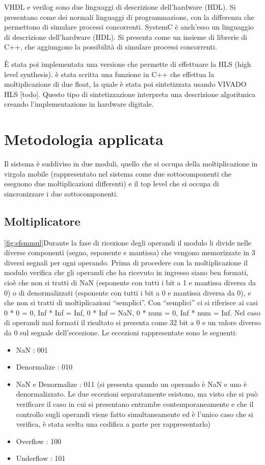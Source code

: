 \documentclass[]{IEEEtran}
\begin{document}
VHDL e verilog sono due linguaggi di descrizione dell’hardware (HDL). Si presentano come dei normali linguaggi di programmazione, con la differenza che permettono di simulare processi concorrenti. SystemC è anch’esso un linguaggio di descrizione dell’hardware (HDL). Si presenta come un insieme di librerie di C++, che aggiungono la possibilità di simulare processi concorrenti.

È stata poi implementata una versione che permette di effettuare la HLS (high level synthesis). è stata scritta una funzione in C++ che effettua la moltiplicazione di due float, la quale è stata poi sintetizzata usando VIVADO HLS [todo]. Questo tipo di sintetizzazione interpreta una descrizione algoritmica creando l’implementazione in hardware digitale. 

\section{Metodologia applicata}

Il sistema è suddiviso in due moduli, quello che si occupa della moltiplicazione in virgola mobile (rappresentato nel sistema come due sottocomponenti che eseguono due moltiplicazioni differenti) e il top level che si occupa di sincronizzare i due sottocomponenti.

\subsection{Moltiplicatore}
\ref{fig:efsmmul}Durante la fase di ricezione degli operandi il modulo li divide nelle diverse componenti (segno, esponente e mantissa) che vengono memorizzate in 3 diversi segnali per ogni operando. Prima di procedere con la moltiplicazione il modulo verifica che gli operandi che ha ricevuto in ingresso siano ben formati, cioè che non si tratti di NaN (esponente con tutti i bit a 1 e mantissa diversa da 0) o di denormalizzati (esponente con tutti i bit a 0 e mantissa diversa da 0), e che non si tratti di moltiplicazioni “semplici”. Con “semplici” ci si riferisce ai casi 0 * 0 = 0, Inf * Inf = Inf, 0 * Inf = NaN, 0 * num = 0, Inf * num = Inf.  Nel caso di operandi mal formati il risultato si presenta come 32 bit a 0 e un valore diverso da 0 sul segnale dell’eccezione. Le eccezioni rappresentate sono le seguenti:
\begin{itemize}
	\item NaN : 001
	\item Denormalize : 010	
	\item NaN e Denormalize : 011 (si presenta quando un operando è NaN e uno è denormalizzato. Le due eccezioni separatamente esistono, ma visto che si può verificare il caso in cui si presentano entrambe contemporaneamente e che il controllo sugli operandi viene fatto simultaneamente ed è l’unico caso che si verifica, è stata scelta una codifica a parte per rappresentarlo)
	\item Overflow : 100
	\item Underflow : 101
\end{itemize}
\end{document}
